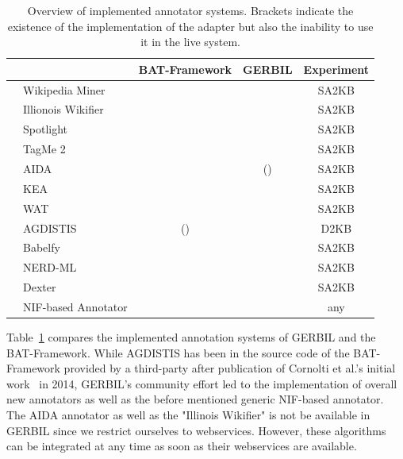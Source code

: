\begin{table}[tb!]
\centering
\begin{tabular}{llccc}
\toprule
                                        && \textbf{BAT-Framework}           & \textbf{GERBIL}                    & \textbf{Experiment}\\
\midrule
\cite{milne2008learning}		&Wikipedia Miner	& \haken 					& \haken	&	SA2KB\\
\cite{rat:rot}							&Illionois Wikifier	& \haken 					& \haken 	& 	SA2KB\\
\cite{spotlight}						&Spotlight           	& \haken                 & \haken  & SA2KB\\
\cite{TagMe2}						&TagMe 2           	& \haken                 & \haken	& SA2KB\\
\cite{AIDA}							&AIDA                	& \haken                 & (\haken)	& SA2KB\\
\cite{Steinmetz2013}			&KEA                	&                         		& \haken	& SA2KB\\
\cite{piccinno2014tagme}	&WAT            		&                         		& \haken 	& SA2KB\\
\cite{agdistis_iswc}				&AGDISTIS           & (\haken)               & \haken	& D2KB\\
\cite{babelfy}						&Babelfy              &                         		& \haken	& SA2KB\\
\cite{rizzo2014}					&NERD-ML          	&                         		& \haken 	& SA2KB\\
\cite{ceccarelli2013dexter}	&Dexter 				&          					& \haken 	& SA2KB\\
											&NIF-based Annotator       &             	& \haken  & any\\
\bottomrule
\end{tabular}
\caption{Overview of implemented annotator systems. Brackets indicate the existence of the implementation of the adapter but also the inability to use it in the live system.}
\label{tab:annotator}
\end{table}
Table~\ref{tab:annotator} compares the implemented annotation systems of GERBIL and the BAT-Framework.
While AGDISTIS has been in the source code of the BAT-Framework provided by a third-party after publication of Cornolti et al.'s initial work~\cite{cornolti} in 2014, GERBIL's community effort led to the implementation of overall \numberOfadditionalAnnotators new annotators as well as the before mentioned generic NIF-based annotator.
The AIDA annotator as well as the "Illinois Wikifier" is not be available in GERBIL since we restrict ourselves to webservices.
However, these algorithms can be integrated at any time as soon as their webservices are available.

